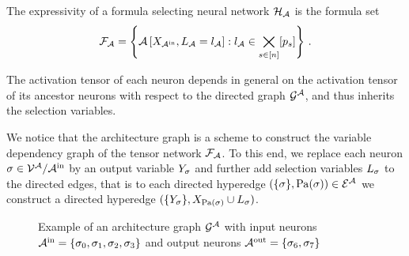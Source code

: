 \begin{definition}
	The expressivity of a formula selecting neural network $\mathcal{H}_{\mathcal{A}}$ is the formula set
	\begin{align*}
		\mathcal{F}_{\mathcal{A}} = \left\{ \mathcal{A}\left[X_{\mathcal{A}^{\mathrm{in}}},L_{\mathcal{A}}=l_{\mathcal{A}}\right]  : l_{\mathcal{A}}\in\bigtimes_{s\in[n]}[p_{s}] \right\} \, . 
	\end{align*}
	
\end{definition}

The activation tensor of each neuron depends in general on the activation tensor of its ancestor neurons with respect to the directed graph $\mathcal{G}^{\mathcal{A}}$, and thus inherits the selection variables.

We notice that the architecture graph is a scheme to construct the variable dependency graph of the tensor network $\mathcal{F}_{\mathcal{A}}$.
To this end, we replace each neuron $\sigma\in\mathcal{V}^{\mathcal{A}}/\mathcal{A}^{\mathrm{in}}$ by an output variable $Y_{\sigma}$ and further add selection variables $L_{\sigma}$ to the directed edges, that is to each directed hyperedge $(\{\sigma\}, \mathrm{Pa}(\sigma))\in\mathcal{E}^{\mathcal{A}}$ we construct a directed hyperedge $(\{Y_{\sigma}\}, X_{\mathrm{Pa}(\sigma)}\cup L_{\sigma})$.

\begin{figure}[h]
\begin{center}
	
\end{center}
\caption{Example of an architecture graph $\mathcal{G}^{\mathcal{A}}$ with input neurons $\mathcal{A}^{\mathrm{in}}=\{\sigma_{0},\sigma_{1},\sigma_{2},\sigma_{3}\}$ and output neurons $\mathcal{A}^{\mathrm{out}}=\{\sigma_{6},\sigma_{7}\}$
}
\label{fig:architectureGraph}
\end{figure}


